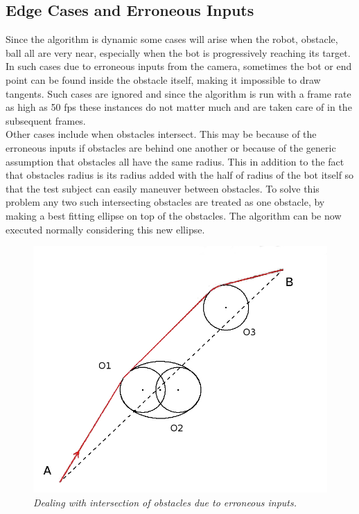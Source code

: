 \documentclass[letterpaper, 10 pt, conference]{ieeeconf}  %
\begin{document}
\subsection{Edge Cases and Erroneous Inputs}
Since the algorithm is dynamic some cases will arise when the robot, obstacle, ball all are very near, especially when the bot is progressively reaching its target. In such cases due to erroneous inputs from the camera, sometimes the bot or end point can be found inside the obstacle itself, making it impossible to draw tangents. Such cases are ignored and since the algorithm is run with a frame rate as high as 50 fps these instances do not matter much and are taken care of in the subsequent frames.
\\ 
Other cases include when obstacles intersect. This may be because of the erroneous inputs if obstacles are behind one another or because of the generic assumption that obstacles all have the same radius. This in addition to the fact that obstacles radius is its radius added with the half of radius of the bot itself so that the test subject can easily maneuver between obstacles. To solve this problem any two such intersecting obstacles are treated as one obstacle, by making a best fitting ellipse on top of the obstacles. The algorithm can be now executed normally considering this new ellipse.

\begin{figure}[h]  
\begin{center}  
\includegraphics[scale=0.25]{intersection1.JPG}  
\caption{\small \sl Dealing with intersection of obstacles due to erroneous inputs.\label{fig: intersection}}  
\end{center}  
\end{figure}
\end{document}
